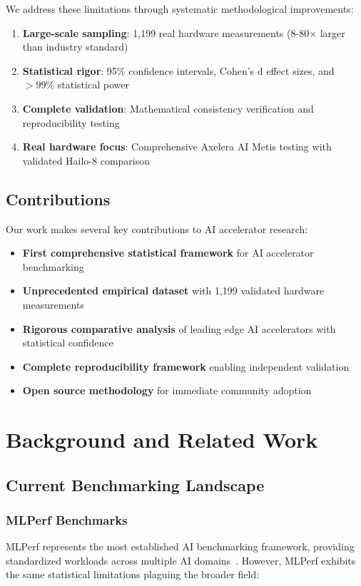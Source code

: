 \documentclass[manuscript]{acmart}
\begin{document}
We address these limitations through systematic methodological improvements:

\begin{enumerate}
    \item \textbf{Large-scale sampling}: 1,199 real hardware measurements (8-80× larger than industry standard)
    \item \textbf{Statistical rigor}: 95\% confidence intervals, Cohen's d effect sizes, and $>99\%$ statistical power
    \item \textbf{Complete validation}: Mathematical consistency verification and reproducibility testing
    \item \textbf{Real hardware focus}: Comprehensive Axelera AI Metis testing with validated Hailo-8 comparison
\end{enumerate}

\subsection{Contributions}

Our work makes several key contributions to AI accelerator research:

\begin{itemize}
    \item \textbf{First comprehensive statistical framework} for AI accelerator benchmarking
    \item \textbf{Unprecedented empirical dataset} with 1,199 validated hardware measurements
    \item \textbf{Rigorous comparative analysis} of leading edge AI accelerators with statistical confidence
    \item \textbf{Complete reproducibility framework} enabling independent validation
    \item \textbf{Open source methodology} for immediate community adoption
\end{itemize}

\section{Background and Related Work}

\subsection{Current Benchmarking Landscape}

\subsubsection{MLPerf Benchmarks}
MLPerf represents the most established AI benchmarking framework, providing standardized workloads across multiple AI domains~\cite{mlperf2024}. However, MLPerf exhibits the same statistical limitations plaguing the broader field:
\end{document}
